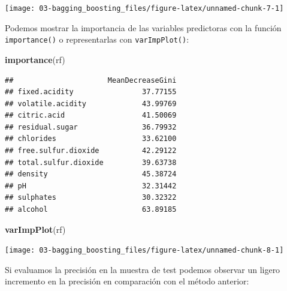 \documentclass[
]{book}
\newenvironment{Shaded}{\begin{snugshade}}{\end{snugshade}}
\newcommand{\DataTypeTok}[1]{\textcolor[rgb]{0.13,0.29,0.53}{#1}}
\newcommand{\KeywordTok}[1]{\textcolor[rgb]{0.13,0.29,0.53}{\textbf{#1}}}
\newcommand{\NormalTok}[1]{#1}
\newcommand{\OperatorTok}[1]{\textcolor[rgb]{0.81,0.36,0.00}{\textbf{#1}}}
\newcommand{\StringTok}[1]{\textcolor[rgb]{0.31,0.60,0.02}{#1}}
\theoremstyle{break}
\theoremstyle{definition}
\theoremstyle{definition}
\theoremstyle{definition}
\theoremstyle{remark}
\begin{document}
\begin{center}\texttt{[image: 03-bagging\_boosting\_files/figure-latex/unnamed-chunk-7-1]} \end{center}

Podemos mostrar la importancia de las variables predictoras con la función \texttt{importance()} o representarlas con \texttt{varImpPlot()}:

\begin{Shaded}
\begin{Highlighting}[]
\KeywordTok{importance}\NormalTok{(rf)}
\end{Highlighting}
\end{Shaded}

\begin{verbatim}
##                      MeanDecreaseGini
## fixed.acidity                37.77155
## volatile.acidity             43.99769
## citric.acid                  41.50069
## residual.sugar               36.79932
## chlorides                    33.62100
## free.sulfur.dioxide          42.29122
## total.sulfur.dioxide         39.63738
## density                      45.38724
## pH                           32.31442
## sulphates                    30.32322
## alcohol                      63.89185
\end{verbatim}

\begin{Shaded}
\begin{Highlighting}[]
\KeywordTok{varImpPlot}\NormalTok{(rf)}
\end{Highlighting}
\end{Shaded}

\begin{center}\texttt{[image: 03-bagging\_boosting\_files/figure-latex/unnamed-chunk-8-1]} \end{center}

Si evaluamos la precisión en la muestra de test podemos observar un ligero incremento en la precisión en comparación con el método anterior:

\begin{Shaded}
\end{Shaded}
\end{document}
